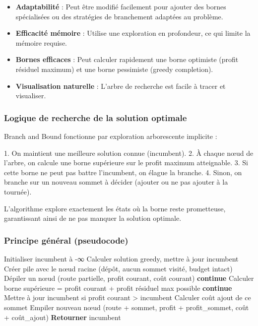 \documentclass[11pt,a4paper]{article}
\begin{document}
\begin{itemize}
    \item \textbf{Adaptabilité} : Peut être modifié facilement pour ajouter des bornes spécialisées ou des stratégies de branchement adaptées au problème.
    \item \textbf{Efficacité mémoire} : Utilise une exploration en profondeur, ce qui limite la mémoire requise.
    \item \textbf{Bornes efficaces} : Peut calculer rapidement une borne optimiste (profit résiduel maximum) et une borne pessimiste (greedy completion).
    \item \textbf{Visualisation naturelle} : L'arbre de recherche est facile à tracer et visualiser.
\end{itemize}

\subsubsection*{Logique de recherche de la solution optimale}

Branch and Bound fonctionne par exploration arborescente implicite :

1. On maintient une meilleure solution connue (incumbent).
2. À chaque nœud de l'arbre, on calcule une borne supérieure sur le profit maximum atteignable.
3. Si cette borne ne peut pas battre l'incumbent, on élague la branche.
4. Sinon, on branche sur un nouveau sommet à décider (ajouter ou ne pas ajouter à la tournée).

L'algorithme explore exactement les états où la borne reste prometteuse, garantissant ainsi de ne pas manquer la solution optimale.

\subsubsection*{Principe général (pseudocode)}

\begin{algorithm}[H]
\caption{Branch and Bound pour l'OP}
\begin{algorithmic}[1]
\State Initialiser incumbent à -∞
\State Calculer solution greedy, mettre à jour incumbent
\State Créer pile avec le nœud racine (dépôt, aucun sommet visité, budget intact)
    \State Dépiler un nœud (route partielle, profit courant, coût courant)
        \State \textbf{continue} 
    \EndIf
    \State Calculer borne supérieure = profit courant + profit résiduel max possible
        \State \textbf{continue} 
    \EndIf
        \State Mettre à jour incumbent si profit courant > incumbent
    \EndIf
        \State Calculer coût ajout de ce sommet
            \State Empiler nouveau nœud (route + sommet, profit + profit\_sommet, coût + coût\_ajout)
        \EndIf
    \EndFor
\EndWhile
\State \textbf{Retourner} incumbent
\end{algorithmic}
\end{algorithm}
\end{document}
